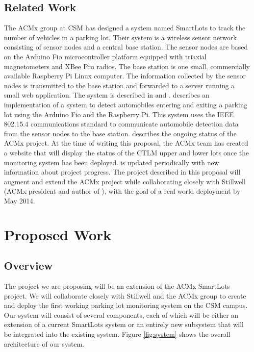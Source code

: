 \documentclass[11pt, oneside, fullpage, doublespace]{article}
\begin{document}
\subsection{Related Work}
The ACMx group at CSM has designed a system named SmartLots to track the number of vehicles in a parking lot. Their system is a wireless sensor network consisting of sensor nodes and a central base station. The sensor nodes are based on the Arduino Fio microcontroller platform equipped with triaxial magnetometers and XBee Pro radios. The base station is one small, commercially available Raspberry Pi Linux computer. The information collected by the sensor nodes is transmitted to the base station and forwarded to a server running a small web application. The system is described in \cite{stillwell2013} and \cite{parkingWiki}. \cite{stillwell2013} describes an implementation of a system to detect automobiles entering and exiting a parking lot using the Arduino Fio and the Raspberry Pi. This system uses the IEEE 802.15.4 communications standard to communicate automobile detection data from the sensor nodes to the base station. \cite{parkingWiki} describes the ongoing status of the ACMx project. At the time of writing this proposal, the ACMx team has created a website that will display the status of the CTLM upper and lower lots once the monitoring system has been deployed. \cite{parkingWiki} is updated periodically with new information about project progress. The project described in this proposal will augment and extend the ACMx project while collaborating closely with Stillwell (ACMx president and author of \cite{stillwell2013}), with the goal of a real world deployment by May 2014.

\section{Proposed Work}
\subsection{Overview}
The project we are proposing will be an extension of the ACMx SmartLots project. We will collaborate closely with Stillwell and the ACMx group to create and deploy the first working parking lot monitoring system on the CSM campus. Our system will consist of several components, each of which will be either an extension of a current SmartLots system or an entirely new subsystem that will be integrated into the existing system. Figure \ref{fig:system} shows the overall architecture of our system.
\end{document}
